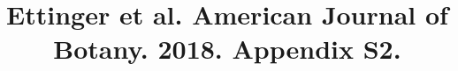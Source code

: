 \documentclass{article}
\begin{document}

\title{Ettinger et al. American Journal of Botany. 2018. Appendix S2.} 
\maketitle  %
\renewcommand{\thetable}{Appendix S\arabic{table}}
\setcounter{table}{1}




%

\end{document}
